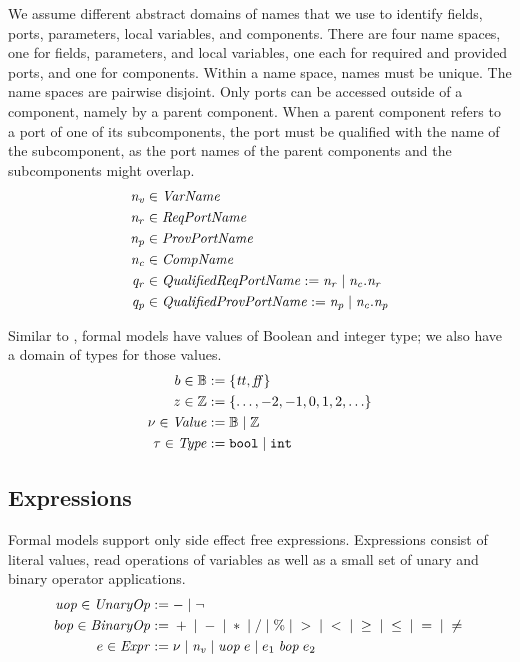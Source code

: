 \documentclass[a4paper,10pt,english]{article}
\begin{document}
We assume different abstract domains of names that we use to identify fields, ports, parameters, local variables, and components.
There are four name spaces, one for fields, parameters, and local variables, one each for required and provided ports, and one for
components. Within a name space, names must be unique. The name spaces are pairwise disjoint. Only ports can be accessed
outside of a component, namely by a parent component. When a parent component refers to a port of one of its
subcomponents, the port must be qualified with the name of the subcomponent, as the port names of the parent components and the
subcomponents might overlap.
\begin{align*}
	\mathit{n_v} &\in \mathit{VarName} \\
	\mathit{n_r} &\in \mathit{ReqPortName} \\
	\mathit{n_p} &\in \mathit{ProvPortName} \\
	\mathit{n_c} &\in \mathit{CompName} \\
	\mathit{q_r} &\in \mathit{QualifiedReqPortName} := \mathit{n_r} \mid \mathit{n_c}\mathtt{.}\mathit{n_r} \\
	\mathit{q_p} &\in \mathit{QualifiedProvPortName} := \mathit{n_p} \mid \mathit{n_c}\mathtt{.}\mathit{n_p}
\end{align*}

Similar to \Fil, formal models have values of Boolean and integer type; we also have a domain of types
for those values.
\begin{align*}
    b \in \mathbb{B} &:= \{ \mathit{tt}, \mathit{ff} \}
    \\
    z \in \mathbb{Z} &:= \{ \ldots, -2, -1, 0, 1, 2, \ldots \}
    \\
    \nu \in \mathit{Value} &:= \mathbb{B} \mid \mathbb{Z}
    \\
	\tau \in \mathit{Type} &:= \mathtt{bool} \mid \mathtt{int}
\end{align*}

\subsection{Expressions}

Formal models support only side effect free expressions. Expressions consist of literal values, read operations of variables
as well as a small set of unary and binary operator applications.
\begin{align*}
	\mathit{uop} \in \mathit{UnaryOp} & := - \mid \neg
	\\
    \mathit{bop} \in \mathit{BinaryOp} & := {} + {} \mid {} - {} \mid {} \ast {} \mid {} / {}
                       \mid {} \% {} \mid {} > {} \mid {} < {} \mid {} \geq {} 
                       \mid {} \leq {} \mid {} = {} \mid {} \neq {}
	\\
	e \in \mathit{Expr} & := 
		\nu \mid
		\mathit{n_v} \mid 
		\mathit{uop}\; e \mid
		e_1 \;\mathit{bop}\; e_2
\end{align*}
\end{document}
